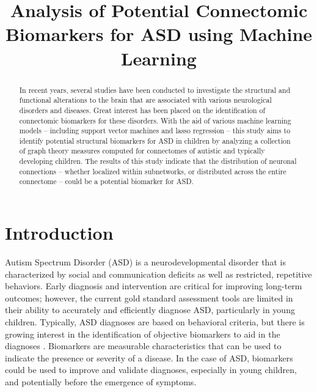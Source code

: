 \documentclass[11pt,conference]{IEEEtran}
\begin{document}
\title{Analysis of Potential Connectomic Biomarkers for ASD using Machine Learning}

\author{
}

\maketitle

\begin{abstract}
    In recent years, several studies have been conducted to investigate the structural and 
    functional alterations to the brain that are associated with various neurological 
    disorders and diseases. Great interest has been placed on the identification of 
    connectomic biomarkers for these disorders. With the aid of various machine learning 
    models -- including support vector machines and lasso regression -- this study aims 
    to identify potential structural biomarkers for ASD in children by analyzing a 
    collection of graph theory measures computed for connectomes of autistic and typically 
    developing children. The results of this study indicate that the distribution of 
    neuronal connections -- whether localized within subnetworks, or distributed across 
    the entire connectome -- could be a potential biomarker for ASD.
\end{abstract}


\section{Introduction}

Autism Spectrum Disorder (ASD) is a neurodevelopmental disorder that is characterized by 
social and communication deficits as well as restricted, repetitive behaviors. Early 
diagnosis and intervention are critical for improving long-term outcomes; however, the 
current gold standard assessment tools are limited in their ability to accurately and 
efficiently diagnose ASD, particularly in young children. Typically, ASD diagnoses are 
based on behavioral criteria, but there is growing interest in the identification of 
objective biomarkers to aid in the diagnoses \cite{Shen.2019}. Biomarkers are measurable 
characteristics that can be used to indicate the presence or severity of a disease. In the 
case of ASD, biomarkers could be used to improve and validate diagnoses, especially in 
young children, and potentially before the emergence of symptoms.
\end{document}
